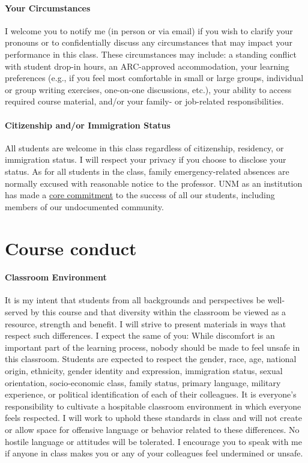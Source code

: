 \documentclass[11pt]{article}
\begin{document}
\paragraph{Your Circumstances} I welcome you to notify me (in person or via email) if you wish to clarify your pronouns or to confidentially discuss any circumstances that may impact your performance in this class. These circumstances may include: a standing conflict with student drop-in hours, an ARC-approved accommodation, your learning preferences (e.g., if you feel most comfortable in small or large groups, individual or group writing exercises, one-on-one discussions, etc.), your ability to access required course material, and/or your family- or job-related responsibilities.

\paragraph{Citizenship and/or Immigration Status} All students are welcome in this class regardless of citizenship, residency, or immigration status. I will respect your privacy if you choose to disclose your status. As for all students in the class, family emergency-related absences are normally excused with reasonable notice to the professor. UNM as an institution has made a \href{http://undocumented.unm.edu/}{core commitment} to the success of all our students, including members of our undocumented community.

\section*{Course conduct}

\paragraph{Classroom Environment} It is my intent that students from all backgrounds and perspectives be well-served by this course and that diversity within the classroom be viewed as a resource, strength and benefit. I will strive to present materials in ways that respect such differences. I expect the same of you: While discomfort is an important part of the learning process, nobody should be made to feel unsafe in this classroom. Students are expected to respect the gender, race, age, national origin, ethnicity, gender identity and expression, immigration status, sexual orientation, socio-economic class, family status, primary language, military experience, or political identification of each of their colleagues. It is everyone’s responsibility to cultivate a hospitable classroom environment in which everyone feels respected. I will work to uphold these standards in class and will not create or allow space for offensive language or behavior related to these differences. No hostile language or attitudes will be tolerated. I encourage you to speak with me if anyone in class makes you or any of your colleagues feel undermined or unsafe.
\end{document}
